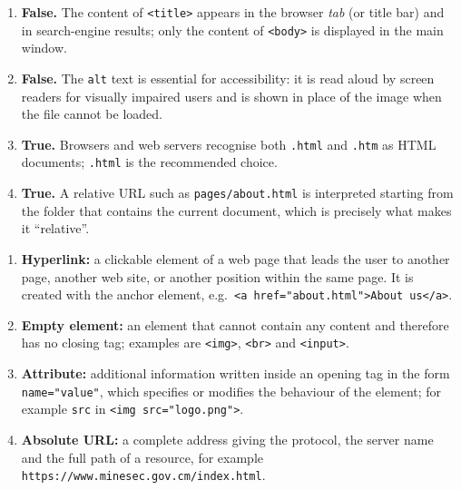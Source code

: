 \documentclass[11pt]{article}
\begin{document}
\begin{corrige}
\begin{enumerate}
\item \textbf{False.} The content of \texttt{<title>} appears in the browser \emph{tab} (or title bar) and in search-engine results; only the content of \texttt{<body>} is displayed in the main window.
\item \textbf{False.} The \texttt{alt} text is essential for accessibility: it is read aloud by screen readers for visually impaired users and is shown in place of the image when the file cannot be loaded.
\item \textbf{True.} Browsers and web servers recognise both \texttt{.html} and \texttt{.htm} as HTML documents; \texttt{.html} is the recommended choice.
\item \textbf{True.} A relative URL such as \texttt{pages/about.html} is interpreted starting from the folder that contains the current document, which is precisely what makes it ``relative''.
\end{enumerate}
\end{corrige}

\begin{corrige}
\begin{enumerate}
\item \textbf{Hyperlink:} a clickable element of a web page that leads the user to another page, another web site, or another position within the same page. It is created with the anchor element, e.g.\ \texttt{<a href="about.html">About us</a>}.
\item \textbf{Empty element:} an element that cannot contain any content and therefore has no closing tag; examples are \texttt{<img>}, \texttt{<br>} and \texttt{<input>}.
\item \textbf{Attribute:} additional information written inside an opening tag in the form \texttt{name="value"}, which specifies or modifies the behaviour of the element; for example \texttt{src} in \texttt{<img src="logo.png">}.
\item \textbf{Absolute URL:} a complete address giving the protocol, the server name and the full path of a resource, for example \texttt{https://www.minesec.gov.cm/index.html}.
\end{enumerate}
\end{corrige}
\end{document}
